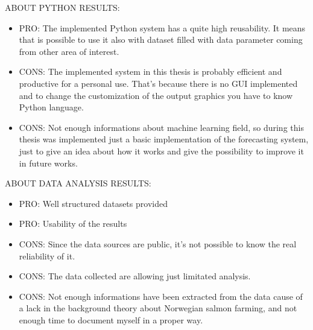 ABOUT PYTHON RESULTS:
\vspace{-5mm}
\begin{itemize}
 \setlength{\itemsep}{-5pt}
\item PRO: The implemented Python system has a quite high reusability. It means that is possible to use it also with dataset filled with data parameter coming from other area of interest.
\item CONS: The implemented system in this thesis is probably efficient and productive for a personal use. That's because there is no GUI implemented and to change the customization of the output graphics you have to know Python language.
\item CONS: Not enough informations about machine learning field, so during this thesis was implemented just a basic implementation of the forecasting system, just to give an idea about how it works and give the possibility to improve it in future works.
\end{itemize}


ABOUT DATA ANALYSIS RESULTS:
\vspace{-5mm}
\begin{itemize}
 \setlength{\itemsep}{-5pt}
 \item PRO: Well structured datasets provided
 \item PRO: Usability of the results 
 \item CONS: Since the data sources are public, it's not possible to know the real reliability of it.
 \item CONS: The data collected are allowing just limitated analysis.
 \item CONS: Not enough informations have been extracted from the data cause of a lack in the background theory about Norwegian salmon farming, and not enough time to document myself in a proper way.
\end{itemize}


